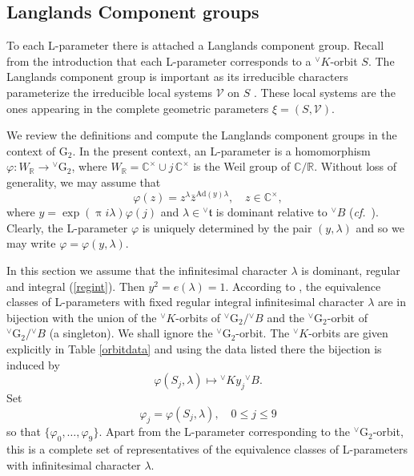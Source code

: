 \documentclass[a4paper, 11pt]{article}
\begin{document}
\subsection{Langlands Component groups}
\label{compgroupsec}

To each L-parameter there is attached a Langlands component
group. Recall from the introduction that each L-parameter
corresponds to a ${^\vee}K$-orbit $S$.  The Langlands component group is
important as its irreducible characters  parameterize  the
irreducible local systems $\mathcal{V}$ on $S$  \cite[Lemma 7.3
  (e)]{ABV}.  These local systems are the ones appearing in the
complete geometric parameters $\xi = (S,\mathcal{V})$.

We review the definitions and compute the Langlands component groups
in the context of $\mathrm{G}_{2}$.   
In the present context, an L-parameter is a homomorphism
$\varphi: W_{\mathbb{R}} \rightarrow {^\vee}\mathrm{G}_{2}$, where
$W_{\mathbb{R}} = \mathbb{C}^{\times} \cup j \, \mathbb{C}^{\times}$
is the Weil group of $\mathbb{C}/\mathbb{R}$.  
Without loss of generality, we may assume that
\begin{equation}
\label{lparam}
\varphi(z) = z^{\lambda} \bar{z}^{\mathrm{Ad}(y) \lambda}, \quad z
\in \mathbb{C}^{\times},
\end{equation}
where $y = \exp(\uppi i \lambda)  \varphi(j)$ and $\lambda \in
{^\vee}\mathfrak{t}$ is dominant relative to ${^\vee}B$
(\emph{cf.}~\cite[(5.7)]{ABV}). 
Clearly, the L-parameter 
$\varphi$ is uniquely determined by the pair $(y,\lambda)$ and so we
may write $\varphi = \varphi(y, \lambda)$. 

In this section we assume 
that the infinitesimal character $\lambda$ is dominant, regular and
integral (\ref{regint}).
Then $y^{2} = e(\lambda) = 1$.  According to \cite[Proposition 6.16
  and Proposition 6.17]{ABV}, the equivalence classes of L-parameters
with fixed regular integral infinitesimal character $\lambda$ are in
bijection with the union  of the ${^\vee}K$-orbits of
${^\vee}\mathrm{G}_{2}/ {^\vee}B$ and the
$^{\vee}\mathrm{G}_{2}$-orbit of ${^\vee}\mathrm{G}_{2}/ {^\vee}B$ (a
singleton).  We shall ignore the ${^\vee}\mathrm{G}_{2}$-orbit.  The 
${^\vee}K$-orbits are given explicitly in Table \ref{orbitdata}
and using the data listed there the bijection is induced by
\begin{equation}
\label{lparambij}
\varphi(S_{j}, \lambda) \longmapsto {^\vee}K y_{j} {^\vee}B.
\end{equation}
Set 
$$\varphi_{j} = \varphi(S_{j}, \lambda), \quad  0 \leq j \leq 9$$
so that $\{ \varphi_{0}, \ldots , \varphi_{9}\}$. Apart from the
L-parameter corresponding to the ${^\vee}\mathrm{G}_{2}$-orbit, this
is a complete set of 
representatives of the equivalence classes of L-parameters with
infinitesimal character $\lambda$.  
\end{document}

